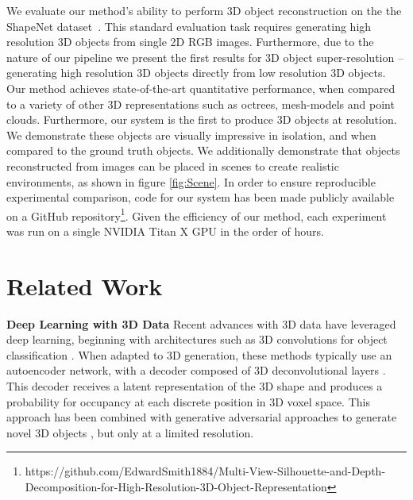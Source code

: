 \documentclass{article}
\begin{document}
We evaluate our method's ability to perform 3D object reconstruction on the the ShapeNet dataset~\cite{ShapeNet}. This standard evaluation task requires generating high resolution 3D objects from single 2D RGB images. Furthermore, due to the nature of our pipeline we present the first results for 3D object super-resolution -- generating high resolution 3D objects directly from low resolution 3D objects. Our method achieves state-of-the-art quantitative performance, when compared to a variety of other 3D representations such as octrees, mesh-models and point clouds. 
Furthermore, our system is the first to produce 3D objects at  resolution. We demonstrate these objects are visually impressive in isolation, and when compared to the ground truth objects. We additionally demonstrate that objects reconstructed from images can be placed in scenes to create realistic environments, as shown in figure \ref{fig:Scene}. In order to ensure reproducible experimental comparison, code for our system has been made publicly available on a GitHub repository\footnote{https://github.com/EdwardSmith1884/Multi-View-Silhouette-and-Depth-Decomposition-for-High-Resolution-3D-Object-Representation}. Given the efficiency of our method, each experiment was run on a single NVIDIA Titan X GPU in the order of hours. 

\section{Related Work}

\begin{figure*}
\qquad
{}
\centering
\caption{Scene created from objects reconstructed by our method from RGB images at  resolution. See the supplementary video for better viewing \url{https://sites.google.com/site/mvdnips2018}.}\label{fig:Scene}
\end{figure*}

\textbf{Deep Learning with 3D Data} \quad Recent advances with 3D data have leveraged deep learning, beginning with architectures such as 3D convolutions for object classification \cite{maturana2015voxnet, li2016fpnn}. 
When adapted to 3D generation, these methods typically use an autoencoder network, with a decoder composed of 3D deconvolutional layers \cite{choy20163d,3DGAN}. This decoder receives a latent representation of the 3D shape and produces a probability for occupancy at each discrete position in 3D voxel space. This approach has been combined with generative adversarial approaches \cite{GAN} to generate novel 3D objects \cite{3DGAN, 3DIWGAN, liu2017interactive}, but only at a limited resolution.
\end{document}
